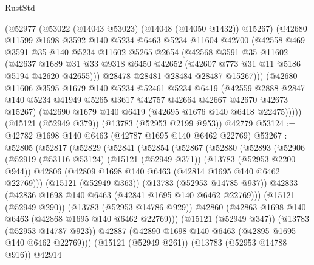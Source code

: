 \begin{lexlean}{RustStd}
\begin{coremodule}
        (@52977
          (@53022 (@14043 @53023) (@14048 (@14050 @1432)) @15267)
          (@42680
            @11599
            @1698
            @3592
            @140
            @5234
            @6463
            @5234
            @11604
            @42700
            (@42558
              @469
              @3591
              @35
              @140
              @5234
              @11602
              @5265
              @2654
              (@42568
                @3591
                @35
                @11602
                (@42637
                  @1689
                  @31
                  @33
                  @9318
                  @6450
                  @42652
                  (@42607 @773 @31 @11 @5186 @5194 @42620 @42655)))
              @28478
              @28481
              @28484
              @28487
              @15267)))
        (@42680
          @11606
          @3595
          @1679
          @140
          @5234
          @52461
          @5234
          @6419
          (@42559
            @2888
            @2847
            @140
            @5234
            @41949
            @5265
            @3617
            @42757
            @42664
            @42667
            @42670
            @42673
            @15267)
          (@42690 @1679 @140 @6419 (@42695 @1676 @140 @6418 @22475)))))
    (@15121 (@52949 @379))
    (@13783 (@52953 @2199 @953))
    @42779
@53124 := @42782 @1698 @140 @6463 (@42787 @1695 @140 @6462 @22769)
@53267 := @52805
    (@52817
      (@52829
        (@52841
          (@52854
            (@52867
              (@52880
                (@52893
                  (@52906
                    (@52919
                      (@53116 @53124)
                      (@15121 (@52949 @371))
                      (@13783 (@52953 @2200 @944))
                      @42806
                      (@42809 @1698 @140 @6463 (@42814 @1695 @140 @6462 @22769)))
                    (@15121 (@52949 @363))
                    (@13783 (@52953 @14785 @937))
                    @42833
                    (@42836 @1698 @140 @6463 (@42841 @1695 @140 @6462 @22769)))
                  (@15121 (@52949 @290))
                  (@13783 (@52953 @14786 @929))
                  @42860
                  (@42863 @1698 @140 @6463 (@42868 @1695 @140 @6462 @22769)))
                (@15121 (@52949 @347))
                (@13783 (@52953 @14787 @923))
                @42887
                (@42890 @1698 @140 @6463 (@42895 @1695 @140 @6462 @22769)))
              (@15121 (@52949 @261))
              (@13783 (@52953 @14788 @916))
              @42914

\end{coremodule}
\end{lexlean}
